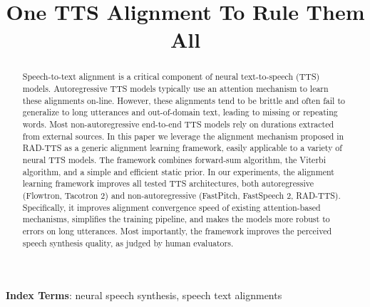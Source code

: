 \documentclass[a4paper]{article}
\title{One TTS Alignment To Rule Them All}
\begin{document}
\maketitle

\begin{abstract}
    Speech-to-text alignment is a critical component of neural text-to-speech (TTS) models. Autoregressive TTS models typically use an attention mechanism to learn these alignments on-line. However, these alignments tend to be brittle and often fail to generalize to long utterances and out-of-domain text, leading to missing or repeating words. Most non-autoregressive end-to-end TTS models rely on durations extracted from external sources. In this paper we leverage the alignment mechanism proposed in RAD-TTS as a generic alignment learning framework, easily applicable to a variety of neural TTS models. The framework combines forward-sum algorithm, the Viterbi algorithm, and a simple and efficient static prior.
    In our experiments, the alignment learning framework improves all tested TTS architectures, both autoregressive (Flowtron, Tacotron 2) and non-autoregressive (FastPitch, FastSpeech 2, RAD-TTS). Specifically, it improves alignment convergence speed of existing attention-based mechanisms, simplifies the training pipeline, and makes the models more robust to errors on long utterances.
    Most importantly, the framework improves the perceived speech synthesis quality, as judged by human evaluators.
\end{abstract}

\noindent\textbf{Index Terms}: neural speech synthesis, speech text alignments 






\pagebreak


\end{document}
